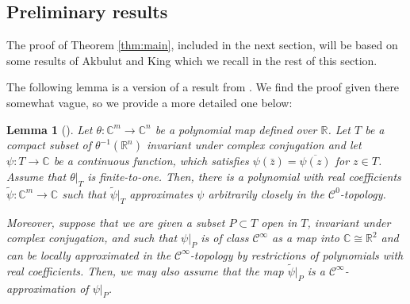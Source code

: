 \documentclass{amsart}
\theoremstyle{plain}
\newtheorem{lem}[thm]{Lemma}
\theoremstyle{definition}
\theoremstyle{remark}
\numberwithin{equation}{thm} %
\newcommand{\R}{\mathbb{R}}
\newcommand{\C}{\mathbb{C}}
\begin{document}
\subsection{Preliminary results}
The proof of Theorem \ref{thm:main}, included in the next section, will be based on some results of Akbulut and King which we recall in the rest of this section.

The following lemma is a version of a result from \cite{akbulutApproximatingSubmanifoldsAlgebraic1992}. We find the proof given there somewhat vague, so we provide a more detailed one below:
\begin{lem}[{\cite[Theorem 8]{akbulutApproximatingSubmanifoldsAlgebraic1992}}]\label{lem:functionApproxAK}
Let $\theta:\C^m\rightarrow \C^n$ be a polynomial map defined over $\R$. Let $T$ be a compact subset of $\theta^{-1}(\R^n)$ invariant under complex conjugation and let $\psi:T\rightarrow \C$ be a continuous function, which satisfies $\psi(\bar z)=\overline{\psi(z)}$ for $z \in T$. Assume that $\theta\vert_T$ is finite-to-one. Then, there is a polynomial with real coefficients $\tilde \psi:\C^m\rightarrow \C$ such that $\tilde \psi\vert_T$ approximates $\psi$ arbitrarily closely in the $\mathcal C^0$-topology. 

Moreover, suppose that we are given a subset $P\subset T$ open in $T$, invariant under complex conjugation, and such that $\psi\vert_P$ is of class $\mathcal C^\infty$ as a map into $\C\cong \R^2$ and can be locally approximated in the $\mathcal C^\infty$-topology by restrictions of polynomials with real coefficients. Then, we may also assume that the map $\tilde \psi\vert_P$ is a $\mathcal C^\infty$-approximation of $\psi\vert_P$.
\end{lem}
\end{document}
